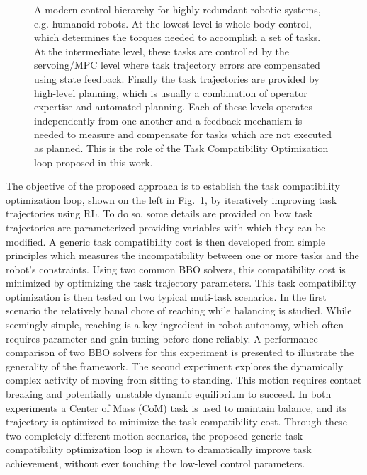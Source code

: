 \documentclass[12pt,a4paper,twoside]{article}
\begin{document}
\begin{figure}[!h]
\begin{minipage}[c]{0.5\textwidth}
\begin{tikzpicture}[node distance=1cm, auto,]
    \end{tikzpicture}
  	\end{minipage}\hfill
  \begin{minipage}[c]{0.47\textwidth}
      \setlength{\belowcaptionskip}{-12pt}
    \caption{A modern control hierarchy for highly redundant robotic systems, e.g. humanoid robots. At the lowest level is whole-body control, which determines the torques needed to accomplish a set of tasks. At the intermediate level, these tasks are controlled by the servoing/MPC level where task trajectory errors are compensated using state feedback. Finally the task trajectories are provided by high-level planning, which is usually a combination of operator expertise and automated planning. Each of these levels operates independently from one another and a feedback mechanism is needed to measure and compensate for tasks which are not executed as planned. This is the role of the Task Compatibility Optimization loop proposed in this work.}
\label{fig:control_diagram}
  \end{minipage}
\end{figure}

The objective of the proposed approach is to establish the task compatibility optimization loop, shown on the left in Fig.~\ref{fig:control_diagram}, by iteratively improving task trajectories using RL. To do so, some details are provided on how task trajectories are parameterized providing variables with which they can be modified. A generic task compatibility cost is then developed from simple principles which measures the incompatibility between one or more tasks and the robot's constraints. Using two common BBO solvers, this compatibility cost is minimized by optimizing the task trajectory parameters. This task compatibility optimization is then tested on two typical muti-task scenarios. In the first scenario the relatively banal chore of reaching while balancing is studied. While seemingly simple, reaching is a key ingredient in robot autonomy, which often requires parameter and gain tuning before done reliably. A performance comparison of two BBO solvers for this experiment is presented to illustrate the generality of the framework. The second experiment explores the dynamically complex activity of moving from sitting to standing. This motion requires contact breaking and potentially unstable dynamic equilibrium to succeed. In both experiments a Center of Mass (CoM) task is used to maintain balance, and its trajectory is optimized to minimize the task compatibility cost. Through these two completely different motion scenarios, the proposed generic task compatibility optimization loop is shown to dramatically improve task achievement, without ever touching the low-level control parameters.
\end{document}
